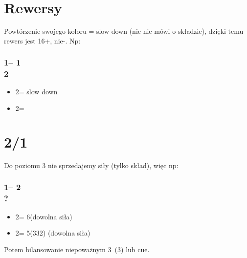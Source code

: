 \documentclass[12pt, a4paper]{report}
\begin{document}
\section*{\colorbox{blue!30}{Rewersy}}
 {
    Powtórzenie swojego koloru = slow down (nic nie mówi o składzie),
    dzięki temu rewers jest 16+, nie-\gf. Np:

    \subsubsection*{1\diams -- 1\spades \\ 2\hearts}
    \begin{itemize}
        \item 2\spades = slow down
        \item 2\nt = \gf
    \end{itemize}
}

\section*{\colorbox{blue!30}{2/1}}
 {
    Do poziomu 3 nie sprzedajemy siły (tylko skład), więc np:\\
    
    \subsubsection*{1\hearts -- 2\clubs \\ ?}
    \begin{itemize}
        \item 2\hearts = 6\hearts (dowolna siła)
        \item 2\nt = 5(332) (dowolna siła)
    \end{itemize}

    Potem bilansowanie niepoważnym 3\nt\ (3\spades) lub cue.
}
\end{document}
